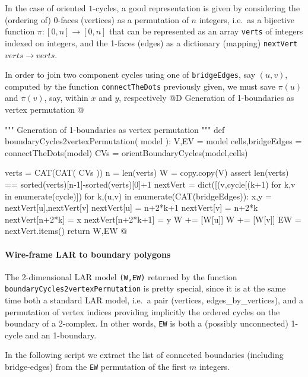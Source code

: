 \documentclass[11pt,oneside]{article}	%
\begin{document}
In the case of oriented $1$-cycles, a good representation is given by considering the (ordering of) 0-faces (vertices) as a permutation of $n$ integers, i.e.~as a bijective function $\pi :[0,n]\to[0,n]$ that can be represented as an array \texttt{verts} of integers indexed on integers, and the 1-faces (edges) as a dictionary (mapping) \texttt{nextVert} $verts\to verts$.

In order to join two component cycles using one of \texttt{bridgeEdges}, say $(u,v)$, computed by the function \texttt{connectTheDots} previously given, we must save $\pi(u)$ and $\pi(v)$, say, within $x$ and $y$, respectively
@D Generation of 1-boundaries as vertex permutation 
@{""" Generation of 1-boundaries as vertex permutation """
def boundaryCycles2vertexPermutation( model ):
    V,EV = model
    cells,bridgeEdges = connectTheDots(model)
    CVs = orientBoundaryCycles(model,cells)
    
    verts = CAT(CAT( CVs ))
    n = len(verts)
    W = copy.copy(V)
    assert len(verts) == sorted(verts)[n-1]-sorted(verts)[0]+1
    nextVert = dict([(v,cycle[(k+1)%
                   for k,v in enumerate(cycle)])
    for k,(u,v) in enumerate(CAT(bridgeEdges)):
        x,y = nextVert[u],nextVert[v]
        nextVert[u] = n+2*k+1
        nextVert[v] = n+2*k      
        nextVert[n+2*k] = x
        nextVert[n+2*k+1] = y
        W += [W[u]]
        W += [W[v]]
        EW = nextVert.items()
    return W,EW
@}

\paragraph{Wire-frame LAR to boundary polygons}
The 2-dimensional LAR model \texttt{(W,EW)} returned by the function \texttt{boundaryCycles2vertexPermutation} is pretty special, since it is at the same time both a standard LAR model, i.e.~a pair (vertices, edges\_by\_vertices), and a permutation of vertex indices providing implicitly the ordered cycles on the boundary of a 2-complex. In other words, \texttt{EW} is both a (possibly unconnected) 1-cycle and an 1-boundary.

In the following script we extract the list of connected boundaries (including bridge-edges) from the \texttt{EW} permutation of the first $m$ integers.
\end{document}
